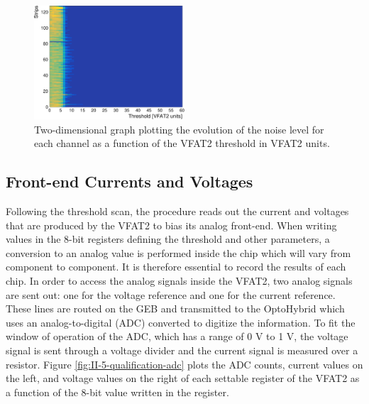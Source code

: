       \begin{figure}[h!]
        \centering
        \includegraphics[width=0.5\textwidth]{img/plots/cThreshold_Channel-crop}
        \caption{Two-dimensional graph plotting the evolution of the noise level for each channel as a function of the VFAT2 threshold in VFAT2 units.}
        \label{fig:II-5-qualification-threshold}
      \end{figure}

    \subsection{Front-end Currents and Voltages}

      Following the threshold scan, the procedure reads out the current and voltages that are produced by the VFAT2 to bias its analog front-end. When writing values in the 8-bit registers defining the threshold and other parameters, a conversion to an analog value is performed inside the chip which will vary from component to component. It is therefore essential to record the results of each chip. In order to access the analog signals inside the VFAT2, two analog signals are sent out: one for the voltage reference and one for the current reference. These lines are routed on the GEB and transmitted to the OptoHybrid which uses an analog-to-digital (ADC) converted to digitize the information. To fit the window of operation of the ADC, which has a range of 0 V to 1 V, the voltage signal is sent through a voltage divider and the current signal is measured over a resistor. Figure \ref{fig:II-5-qualification-adc} plots the ADC counts, current values on the left, and voltage values on the right of each settable register of the VFAT2 as a function of the 8-bit value written in the register.

